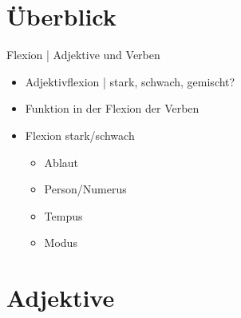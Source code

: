 \section{Überblick}

\begin{frame}
  {Flexion | Adjektive und Verben}
  \onslide<+->
  \begin{itemize}[<+->]
    \item Adjektivflexion | stark, schwach, gemischt?
      \Zeile
    \item Funktion in der Flexion der Verben
    \item Flexion stark\slash schwach
      \begin{itemize}[<+->]
        \item Ablaut
        \item Person\slash Numerus
        \item Tempus
        \item Modus
      \end{itemize}
  \end{itemize}
\end{frame}

\section{Adjektive}

